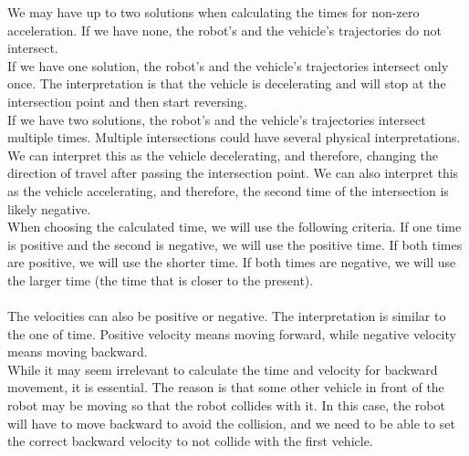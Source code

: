         We may have up to two solutions when calculating the times for non-zero acceleration. If we have none, the robot's and the vehicle's trajectories do not intersect.\\
        If we have one solution, the robot's and the vehicle's trajectories intersect only once. The interpretation is that the vehicle is decelerating and will stop at the intersection point and then start reversing.\\
        If we have two solutions, the robot's and the vehicle's trajectories intersect multiple times. Multiple intersections could have several physical interpretations. We can interpret this as the vehicle decelerating, and therefore, changing the direction of travel after passing the intersection point. We can also interpret this as the vehicle accelerating, and therefore, the second time of the intersection is likely negative.\\
        When choosing the calculated time, we will use the following criteria. If one time is positive and the second is negative, we will use the positive time. If both times are positive, we will use the shorter time. If both times are negative, we will use the larger time (the time that is closer to the present).\\\\
        The velocities can also be positive or negative. The interpretation is similar to the one of time. Positive velocity means moving forward, while negative velocity means moving backward.\\
        While it may seem irrelevant to calculate the time and velocity for backward movement, it is essential. The reason is that some other vehicle in front of the robot may be moving so that the robot collides with it. In this case, the robot will have to move backward to avoid the collision, and we need to be able to set the correct backward velocity to not collide with the first vehicle.
